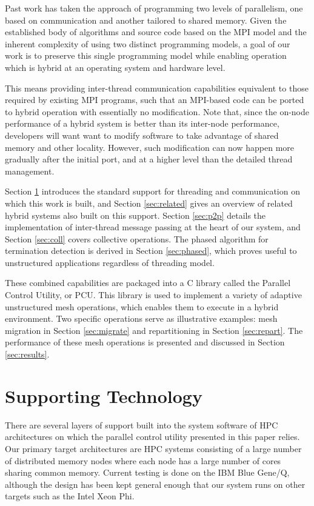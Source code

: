 \documentclass[final,1p,times]{elsarticle}
\begin{document}
Past work has taken the approach of programming two levels of
parallelism, one based on communication and another tailored to shared memory.
Given the established body of algorithms and source code based on the MPI model
and the inherent complexity of using two distinct programming models,
a goal of our work is to preserve this single programming model while enabling
operation which is hybrid at an operating system and hardware level.

This means providing inter-thread communication capabilities equivalent to
those required by existing MPI programs, such that an MPI-based
code can be ported to hybrid operation with essentially no modification.
Note that, since the on-node performance of a hybrid system is better
than its inter-node performance, developers will want want to modify
software to take advantage of shared memory and other locality.
However, such modification can now happen more gradually after the initial
port, and at a higher level than the detailed thread management.

Section \ref{sec:thread} introduces the standard support for
threading and communication on which this work is built, and Section
\ref{sec:related} gives an overview of related hybrid systems also
built on this support.
Section \ref{sec:p2p} details the implementation of inter-thread message
passing at the heart of our system, and Section \ref{sec:coll} covers
collective operations.
The phased algorithm for termination detection is derived in Section
\ref{sec:phased}, which proves useful to unstructured applications
regardless of threading model.

These combined capabilities
are packaged into a C library called the Parallel Control Utility, or PCU.
This library is used to implement a variety of adaptive unstructured
mesh operations, which enables them to execute in a hybrid environment.
Two specific operations serve as illustrative examples:
mesh migration in Section \ref{sec:migrate} and repartitioning in
Section \ref{sec:repart}.
The performance of these mesh operations is presented and discussed in
Section \ref{sec:results}.

\section{Supporting Technology}
\label{sec:thread}

There are several layers of support built into the system software 
of HPC architectures on which the parallel control utility
presented in this paper relies.
Our primary target architectures are
HPC systems consisting of a large number of distributed memory nodes
where each node has a large number of cores sharing common memory.
Current testing is done on the IBM Blue Gene/Q, although
the design has been kept general enough that our system runs
on other targets such as the Intel Xeon Phi.
\end{document}

